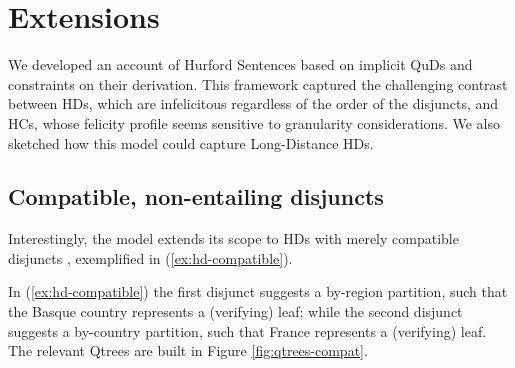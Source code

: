 \section{Extensions}\label{sec:ccl}
We developed an account of Hurford Sentences based on implicit QuDs and constraints on their derivation. This framework captured the challenging contrast between HDs, which are infelicitous regardless of the order of the disjuncts, and HCs, whose felicity profile seems sensitive to granularity considerations. We also sketched how this model could capture Long-Distance HDs.

\subsection{Compatible, non-entailing disjuncts}


Interestingly, the model extends its scope to HDs with merely compatible disjuncts \citep{Singh2008b}, exemplified in (\ref{ex:hd-compatible}).

\begin{exe}
\label{ex:hd-compatible}
\end{exe} 

In (\ref{ex:hd-compatible}) the first disjunct suggests a by-region partition, such that the Basque country represents a (verifying) leaf; while the second disjunct suggests a by-country partition, such that France represents a (verifying) leaf. The relevant Qtrees are built in Figure \ref{fig:qtrees-compat}.

